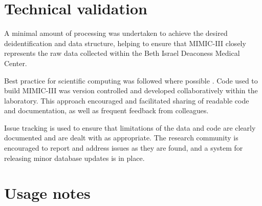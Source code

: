 \documentclass[english]{article}
\begin{document}
\section*{Technical validation}


A minimal amount of processing was undertaken to achieve the desired deidentification and data structure, helping to ensure that MIMIC-III closely represents the raw data collected within the Beth Israel Deaconess Medical Center.

Best practice for scientific computing was followed where possible \cite{cite4}. Code used to build MIMIC-III was version controlled and developed collaboratively within the laboratory. This approach encouraged and facilitated sharing of readable code and documentation, as well as frequent feedback from colleagues.

Issue tracking is used to ensure that limitations of the data and code are clearly documented and are dealt with as appropriate. The research community is encouraged to report and address issues as they are found, and a system for releasing minor database updates is in place.



\section*{Usage notes}

\end{document}
